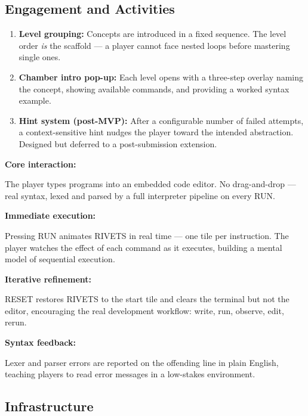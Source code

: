 \documentclass[12pt,a4paper]{article}
\newcommand{\gddfield}[2]{%
  \noindent\begin{minipage}[t]{3.5cm}\bfseries\color{accent}\sffamily#1\end{minipage}%
  \hspace{8pt}%
  \begin{minipage}[t]{\dimexpr\linewidth-3.5cm-8pt\relax}%
    #2
  \end{minipage}\par\smallskip}
\begin{document}
\vspace{6pt}

\subsection{Engagement and Activities}

\begin{tcolorbox}[gddbox, title={Scaffolding}]
\begin{enumerate}[label=\textbf{S\arabic*.}, leftmargin=3em, noitemsep]
  \item \textbf{Level grouping:} Concepts are introduced in a fixed sequence. The level order \emph{is} the scaffold --- a player cannot face nested loops before mastering single ones.
  \item \textbf{Chamber intro pop-up:} Each level opens with a three-step overlay naming the concept, showing available commands, and providing a worked syntax example.
  \item \textbf{Hint system (post-MVP):} After a configurable number of failed attempts, a context-sensitive hint nudges the player toward the intended abstraction. Designed but deferred to a post-submission extension.
\end{enumerate}
\end{tcolorbox}

\vspace{4pt}

\begin{tcolorbox}[gddbox, title={Interactivity and Programming Editor}]
\gddfield{Core interaction:}{The player types programs into an embedded code editor. No drag-and-drop --- real syntax, lexed and parsed by a full interpreter pipeline on every RUN.}
\gddfield{Immediate execution:}{Pressing RUN animates RIVETS in real time --- one tile per instruction. The player watches the effect of each command as it executes, building a mental model of sequential execution.}
\gddfield{Iterative refinement:}{RESET restores RIVETS to the start tile and clears the terminal but not the editor, encouraging the real development workflow: write, run, observe, edit, rerun.}
\gddfield{Syntax feedback:}{Lexer and parser errors are reported on the offending line in plain English, teaching players to read error messages in a low-stakes environment.}
\end{tcolorbox}

\vspace{6pt}

\subsection{Infrastructure}
\end{document}
